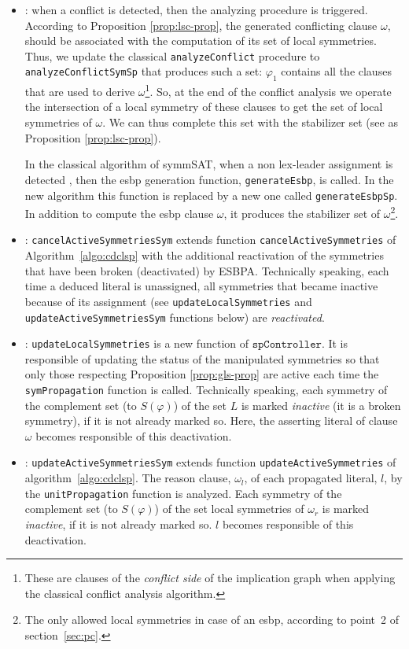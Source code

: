 \begin{itemize}[topsep=2pt]
 \item {}: when a conflict is detected, then the analyzing
 procedure is triggered. According to Proposition \ref{prop:lsc-prop}, the
 generated conflicting clause $\omega$, should be associated with the
 computation of its set of local symmetries. Thus, we update the classical
 \texttt{analyzeConflict} procedure to \texttt{analyzeConflictSymSp} that produces such
 a set: $\varphi_1$ contains all the clauses that are used to derive $\omega$\footnote{These are clauses of the \textit{conflict side} of the implication graph when applying the classical conflict analysis algorithm.}. So, at the end of the conflict analysis we operate the intersection of a local symmetry of these clauses to get the set of local symmetries of $\omega$. We can thus complete this set with the stabilizer set (see as Proposition \ref{prop:lsc-prop}).
 
 In the classical algorithm of symmSAT, when a non lex-leader assignment is detected
 , then the esbp generation function, \texttt{generateEsbp}, is
 called. In the new algorithm this function is replaced by a new one called
 \texttt{generateEsbpSp}. In addition to compute the esbp clause $\omega$, it
 produces the stabilizer set of $\omega$\footnote{The only allowed
  local symmetries in case of an esbp, according to point~2 of
  section~\ref{sec:pc}.}.
 
 \item {}: \texttt{cancelActiveSymmetriesSym} extends function \texttt{cancelActiveSymmetries} of Algorithm~\ref{algo:cdclsp} with the additional reactivation of the symmetries that have been broken (deactivated) by ESBPA. Technically speaking, each time a deduced literal is unassigned, all symmetries that became inactive because of its assignment (see \texttt{updateLocalSymmetries} and \texttt{updateActiveSymmetriesSym} functions below) are \textit{reactivated}.
 
 \item {}: \texttt{updateLocalSymmetries} is a new function of
 $\texttt{spController}$. It is responsible of updating the status of the manipulated
 symmetries so that only those respecting Proposition \ref{prop:gls-prop} are
 active each time the \texttt{symPropagation} function is called. Technically speaking, each symmetry of the complement set (to $S(\varphi)$) of the set $L$ is marked \textit{inactive} (it is a broken symmetry), if it is not already marked so. Here, the asserting literal of clause $\omega$ becomes responsible of this deactivation. 
 
 \item {}: \texttt{updateActiveSymmetriesSym} extends function \texttt{updateActiveSymmetries} of algorithm~\ref{algo:cdclsp}. The reason clause, $\omega_l$, of each propagated literal, $l$, by the \texttt{unitPropagation} function is analyzed. Each symmetry of the complement set (to $S(\varphi)$) of the set local symmetries of $\omega_r$ is marked \textit{inactive}, if it is not already marked so. $l$ becomes responsible of this deactivation. 
\end{itemize}
